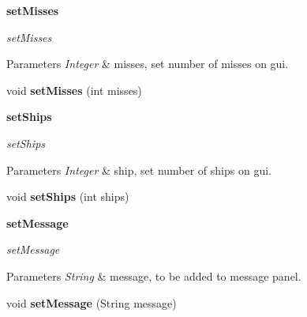 \begin{Indent}{\bf set\+Misses}\par
{\em set\+Misses


\begin{DoxyParams}{Parameters}
{\em Integer} & misses, set number of misses on gui. \\
\hline
\end{DoxyParams}
}\begin{DoxyCompactItemize}
\item 
\hypertarget{classbattleship_1_1screen_1_1Screen_a89efaed96acc8ff09fb0b21339e23f41}{}void {\bfseries set\+Misses} (int misses)\label{classbattleship_1_1screen_1_1Screen_a89efaed96acc8ff09fb0b21339e23f41}

\end{DoxyCompactItemize}
\end{Indent}
\begin{Indent}{\bf set\+Ships}\par
{\em set\+Ships


\begin{DoxyParams}{Parameters}
{\em Integer} & ship, set number of ships on gui. \\
\hline
\end{DoxyParams}
}\begin{DoxyCompactItemize}
\item 
\hypertarget{classbattleship_1_1screen_1_1Screen_a9316e9b7d74579fbf4fa3df9c72197e7}{}void {\bfseries set\+Ships} (int ships)\label{classbattleship_1_1screen_1_1Screen_a9316e9b7d74579fbf4fa3df9c72197e7}

\end{DoxyCompactItemize}
\end{Indent}
\begin{Indent}{\bf set\+Message}\par
{\em set\+Message


\begin{DoxyParams}{Parameters}
{\em String} & message, to be added to message panel. \\
\hline
\end{DoxyParams}
}\begin{DoxyCompactItemize}
\item 
\hypertarget{classbattleship_1_1screen_1_1Screen_a9b75cc961e855846652f17d96172fd57}{}void {\bfseries set\+Message} (String message)\label{classbattleship_1_1screen_1_1Screen_a9b75cc961e855846652f17d96172fd57}

\end{DoxyCompactItemize}
\end{Indent}
